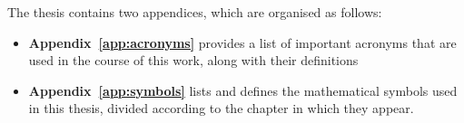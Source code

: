 The thesis contains two appendices, which are organised as follows:

\begin{itemize}
\item\textbf{Appendix~\ref{app:acronyms}} provides a list of important acronyms that are used in the course of this work, along with their definitions

\item\textbf{Appendix~\ref{app:symbols}} lists and defines the mathematical symbols used in this thesis, divided according to the chapter in which they appear.


\end{itemize}







